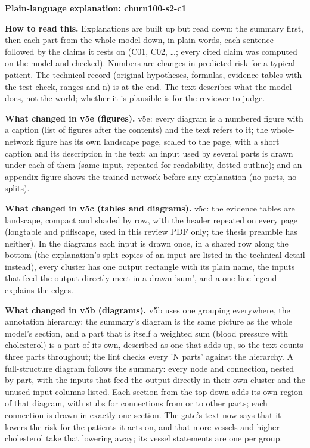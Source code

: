 \documentclass[a4paper,10pt]{article}
\begin{document}
\begin{center}{\Large\bfseries Plain-language explanation: churn100-s2-c1\par}\vspace{2mm}{\small AI-assisted drafts for review. Nothing here has been verified by a person.\par}\end{center}
\noindent\textbf{How to read this.} Explanations are built up but read down: the summary first, then each part from the whole model down, in plain words, each sentence followed by the claims it rests on (C01, C02, \ldots; every cited claim was computed on the model and checked). Numbers are changes in predicted risk for a typical patient. The technical record (original hypotheses, formulas, evidence tables with the test check, ranges and n) is at the end. The text describes what the model does, not the world; whether it is plausible is for the reviewer to judge.
\par\medskip\noindent\textbf{What changed in v5e (figures).} v5e: every diagram is a numbered figure with a caption (list of figures after the contents) and the text refers to it; the whole-network figure has its own landscape page, scaled to the page, with a short caption and its description in the text; an input used by several parts is drawn under each of them (same input, repeated for readability, dotted outline); and an appendix figure shows the trained network before any explanation (no parts, no splits).
\par\medskip\noindent\textbf{What changed in v5c (tables and diagrams).} v5c: the evidence tables are landscape, compact and shaded by row, with the header repeated on every page (longtable and pdflscape, used in this review PDF only; the thesis preamble has neither). In the diagrams each input is drawn once, in a shared row along the bottom (the explanation's split copies of an input are listed in the technical detail instead), every cluster has one output rectangle with its plain name, the inputs that feed the output directly meet in a drawn 'sum', and a one-line legend explains the edges.
\par\medskip\noindent\textbf{What changed in v5b (diagrams).} v5b uses one grouping everywhere, the annotation hierarchy: the summary's diagram is the same picture as the whole model's section, and a part that is itself a weighted sum (blood pressure with cholesterol) is a part of its own, described as one that adds up, so the text counts three parts throughout; the lint checks every 'N parts' against the hierarchy. A full-structure diagram follows the summary: every node and connection, nested by part, with the inputs that feed the output directly in their own cluster and the unused input columns listed. Each section from the top down adds its own region of that diagram, with stubs for connections from or to other parts; each connection is drawn in exactly one section. The gate's text now says that it lowers the risk for the patients it acts on, and that more vessels and higher cholesterol take that lowering away; its vessel statements are one per group.
\end{document}
